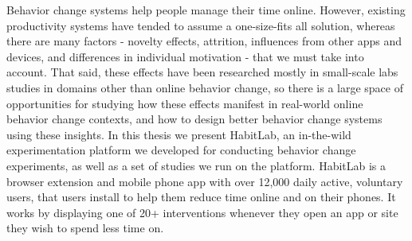 \beforepreface
{}
 

Behavior change systems help people manage their time online. However, existing productivity systems have tended to assume a one-size-fits all solution, whereas there are many factors - novelty effects, attrition, influences from other apps and devices, and differences in individual motivation - that we must take into account. That said, these effects have been researched mostly in small-scale labs studies in domains other than online behavior change, so there is a large space of opportunities for studying how these effects manifest in real-world online behavior change contexts, and how to design better behavior change systems using these insights.   In this thesis we present HabitLab, an in-the-wild experimentation platform we developed for conducting behavior change experiments, as well as a set of studies we run  on the platform. HabitLab is a browser extension and   mobile phone app with over 12,000 daily active, voluntary users, that users install to help them reduce time online and on their phones. It works by displaying one of 20+ interventions whenever they open an app or site they wish to spend less time on.

